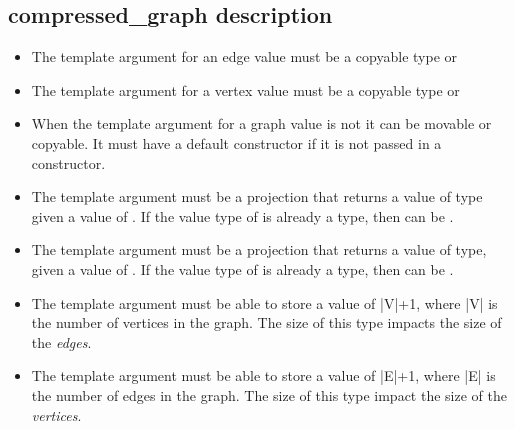 {\small
      
}

\subsection{compressed\_graph description}


\begin{itemdescr}
    \pnum\mandates
        \begin{itemize}
            \item The  template argument for an edge value must be a copyable type or 
            \item The  template argument for a vertex value must be a copyable type or 
            \item When the  template argument for a graph value is not  it can be movable or copyable. It must have a 
                  default constructor if it is not passed in a  constructor.
            \item The  template argument must be a projection that returns a value of  type
                  given a value of . If the value type of  is already a  type, 
                  then  can be .
            \item The  template argument must be a projection that returns a value of  type,
                  given a value of . If the value type of  is already a  type, 
                  then  can be .
        \end{itemize}
    \pnum\preconditions
        \begin{itemize}
            \item The  template argument must be able to store a value of |V|+1, where |V| is the
                  number of vertices in the graph. The size of this type impacts the size of the \textit{edges}.
            \item The  template argument must be able to store a value of |E|+1, where |E| is the
                  number of edges in the graph. The size of this type impact the size of the \textit{vertices}.

\end{itemize}
\end{itemdescr}

